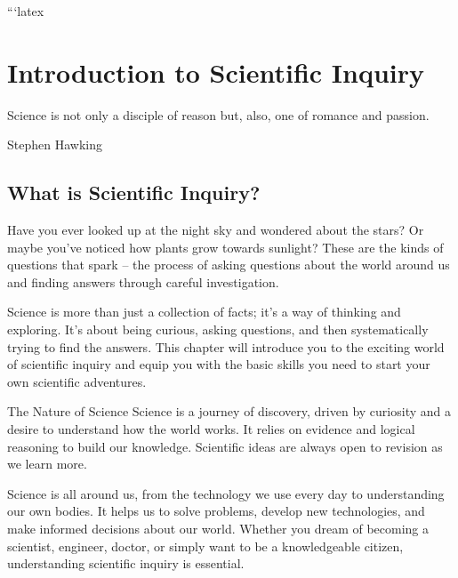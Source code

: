 ```latex
\chapter{Introduction to Scientific Inquiry}

\epigraph{Science is not only a disciple of reason but, also, one of romance and passion.}{Stephen Hawking}

\section{What is Scientific Inquiry?}

Have you ever looked up at the night sky and wondered about the stars? Or maybe you've noticed how plants grow towards sunlight? These are the kinds of questions that spark  – the process of asking questions about the world around us and finding answers through careful investigation.

Science is more than just a collection of facts; it's a way of thinking and exploring. It's about being curious, asking questions, and then systematically trying to find the answers. This chapter will introduce you to the exciting world of scientific inquiry and equip you with the basic skills you need to start your own scientific adventures.


\begin{keyconcept}{The Nature of Science}
Science is a journey of discovery, driven by curiosity and a desire to understand how the world works. It relies on evidence and logical reasoning to build our knowledge. Scientific ideas are always open to revision as we learn more.
\end{keyconcept}

Science is all around us, from the technology we use every day to understanding our own bodies.  It helps us to solve problems, develop new technologies, and make informed decisions about our world. Whether you dream of becoming a scientist, engineer, doctor, or simply want to be a knowledgeable citizen, understanding scientific inquiry is essential.


